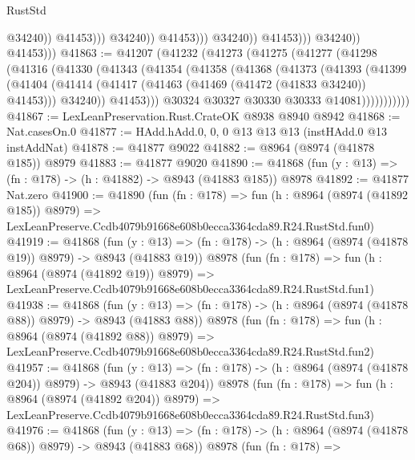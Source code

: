 \begin{lexlean}{RustStd}
\begin{coremodule}
                                            @34240))
                                        @41453)))
                                  @34240))
                              @41453)))
                        @34240))
                    @41453)))
              @34240))
          @41453)))
@41863 := @41207
    (@41232
      (@41273
        (@41275
          (@41277
            (@41298
              (@41316
                (@41330
                  (@41343
                    (@41354
                      (@41358
                        (@41368
                          (@41373
                            (@41393
                              (@41399
                                (@41404
                                  (@41414
                                    (@41417 (@41463 (@41469 (@41472 (@41833 @34240)) @41453)))
                                    @34240))
                                @41453)))
                          @30324
                          @30327
                          @30330
                          @30333
                          @14081)))))))))))
@41867 := LexLeanPreservation.Rust.CrateOK @8938 @8940 @8942
@41868 := Nat.casesOn.{0}
@41877 := HAdd.hAdd.{0, 0, 0} @13 @13 @13 (instHAdd.{0} @13 instAddNat)
@41878 := @41877 @9022
@41882 := @8964 (@8974 (@41878 @185)) @8979
@41883 := @41877 @9020
@41890 := @41868 (fun (y : @13) => (fn : @178) -> (h : @41882) -> @8943 (@41883 @185)) @8978
@41892 := @41877 Nat.zero
@41900 := @41890
    (fun (fn : @178) =>
    fun (h : @8964 (@8974 (@41892 @185)) @8979) =>
    LexLeanPreserve.Ccdb4079b91668e608b0ecca3364cda89.R24.RustStd.fun0)
@41919 := @41868
    (fun (y : @13) => (fn : @178) -> (h : @8964 (@8974 (@41878 @19)) @8979) -> @8943 (@41883 @19))
    @8978
    (fun (fn : @178) =>
    fun (h : @8964 (@8974 (@41892 @19)) @8979) =>
    LexLeanPreserve.Ccdb4079b91668e608b0ecca3364cda89.R24.RustStd.fun1)
@41938 := @41868
    (fun (y : @13) => (fn : @178) -> (h : @8964 (@8974 (@41878 @88)) @8979) -> @8943 (@41883 @88))
    @8978
    (fun (fn : @178) =>
    fun (h : @8964 (@8974 (@41892 @88)) @8979) =>
    LexLeanPreserve.Ccdb4079b91668e608b0ecca3364cda89.R24.RustStd.fun2)
@41957 := @41868
    (fun (y : @13) => (fn : @178) -> (h : @8964 (@8974 (@41878 @204)) @8979) -> @8943 (@41883 @204))
    @8978
    (fun (fn : @178) =>
    fun (h : @8964 (@8974 (@41892 @204)) @8979) =>
    LexLeanPreserve.Ccdb4079b91668e608b0ecca3364cda89.R24.RustStd.fun3)
@41976 := @41868
    (fun (y : @13) => (fn : @178) -> (h : @8964 (@8974 (@41878 @68)) @8979) -> @8943 (@41883 @68))
    @8978
    (fun (fn : @178) =>

\end{coremodule}
\end{lexlean}
